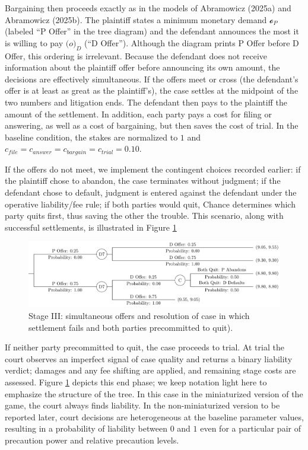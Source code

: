 \documentclass{article}
\begin{document}
Bargaining then proceeds exactly as in the models of Abramowicz (2025a) and Abramowicz (2025b). The plaintiff states a minimum monetary demand $\mathcal{o}_P$ (labeled “P Offer” in the tree diagram) and the defendant announces the most it is willing to pay $\mathcal(o)_D$ (“D Offer”). Although the diagram prints P Offer before D Offer, this ordering is irrelevant. Because the defendant does not receive information about the plaintiff offer before announcing its own amount, the decisions are effectively simultaneous. If the offers meet or cross (the defendant's offer is at least as great as the plaintiff's), the case settles at the midpoint of the two numbers and litigation ends. The defendant then pays to the plaintiff the amount of the settlement. In addition, each party pays a cost for filing or answering, as well as a cost of bargaining, but then saves the cost of trial. In the baseline condition, the stakes are normalized to $1$ and $c_{file} = c_{answer} = c_{bargain} = c_{trial} = 0.10$.

If the offers do not meet, we implement the contingent choices recorded earlier: if the plaintiff chose to abandon, the case terminates without judgment; if the defendant chose to default, judgment is entered against the defendant under the operative liability/fee rule; if both parties would quit, Chance determines which party quits first, thus saving the other the trouble. This scenario, along with successful settlements, is illustrated in Figure \ref{fig:smalltree_end.pdf}

  \begin{figure}[t]
    \centering
    \includegraphics[width=\textwidth]{../Figures/smalltree_end.pdf}
    \caption{Stage III: simultaneous offers and resolution of case in which settlement fails and both parties precommitted to quit).}
    \label{fig:smalltree_end.pdf}
  \end{figure}

If neither party precommitted to quit, the case proceeds to trial. At trial the court observes an imperfect signal of case quality and returns a binary liability verdict; damages and any fee shifting are applied, and remaining stage costs are assessed. Figure \ref{fig:smalltree_end.pdf} depicts this end phase; we keep notation light here to emphasize the structure of the tree. In this case in the miniaturized version of the game, the court always finds liability. In the non-miniaturized version to be reported later, court decisions are heterogeneous at the baseline parameter values, resulting in a probability of liability between $0$ and $1$ even for a particular pair of precaution power and relative precaution levels. 
\end{document}
